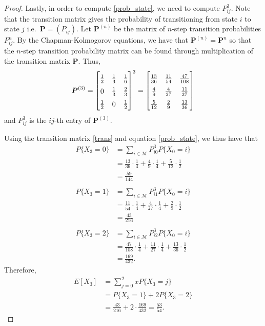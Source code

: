 \begin{proof}
  Lastly, in order to compute \eqref{prob_state}, we need to compute $P_{ij}^3$.
  Note that the transition matrix gives the probability of transitioning from state $i$ to state $j$
  i.e.\ $\boldsymbol{P} = (P_{ij})$. Let $\boldsymbol{P}^{(n)}$ be the matrix
  of $n$-step transition probabilities $P_{ij}^n$. By the Chapman-Kolmogorov
  equations, we have that $\boldsymbol{P}^{(n)} = \boldsymbol{P}^n$
  so that the $n$-step transition probability matrix can be found through multiplication
  of the transition matrix $\boldsymbol{P}$. Thus,
  \begin{align}\label{trans}
    \renewcommand\arraystretch{1.5}
    \boldsymbol{P}^{(3)} =
    \begin{bmatrix}
      \frac{1}{2} & \frac{1}{3} & \frac{1}{6} \\
      0 & \frac{1}{3} & \frac{2}{3} \\
      \frac{1}{2} & 0 & \frac{1}{2} \\
    \end{bmatrix}^3
    =
    \begin{bmatrix}
      \frac{13}{36} & \frac{11}{54} & \frac{47}{108} \\
      \frac{4}{9} & \frac{4}{27} & \frac{11}{27} \\
      \frac{5}{12} & \frac{2}{9} & \frac{13}{36} \\
    \end{bmatrix}
  \end{align}
  and $P_{ij}^3$ is the $ij$-th entry of $\boldsymbol{P}^{(3)}$.

  Using the transition matrix \eqref{trans} and equation \eqref{prob_state}, we thus
  have that
  \begin{align*}
        P\{X_3 = 0 \} &= \sum_{i\in\mathcal{M}} P_{i0}^3 P\{X_0 = i\} \\
        &= \frac{13}{36} \cdot \frac{1}{4} + \frac{4}{9} \cdot \frac{1}{4} + \frac{5}{12}\cdot\frac{1}{2} \\
        &= \frac{59}{144} \\ \\
        P\{X_3 = 1 \} &= \sum_{i\in\mathcal{M}} P_{i1}^3 P\{X_0 = i\} \\
        &= \frac{11}{54} \cdot \frac{1}{4} + \frac{4}{27} \cdot \frac{1}{4} + \frac{2}{9}\cdot\frac{1}{2} \\
        &= \frac{43}{216} \\ \\
        P\{X_3 = 2 \} &= \sum_{i\in\mathcal{M}} P_{i2}^3 P\{X_0 = i\} \\
        &= \frac{47}{108} \cdot \frac{1}{4} + \frac{11}{27} \cdot \frac{1}{4} + \frac{13}{36}\cdot\frac{1}{2} \\
        &= \frac{169}{432}.
  \end{align*}
  Therefore,
  \begin{align*}
    E[X_3] &= \sum_{j=0}^2 x P\{X_3 = j\} \\
    &= P\{X_3 = 1\} + 2 P\{X_3 = 2\} \\
    &= \frac{43}{216} + 2 \cdot \frac{169}{432} = \frac{53}{54}.
  \end{align*}
\end{proof}
\newpage

